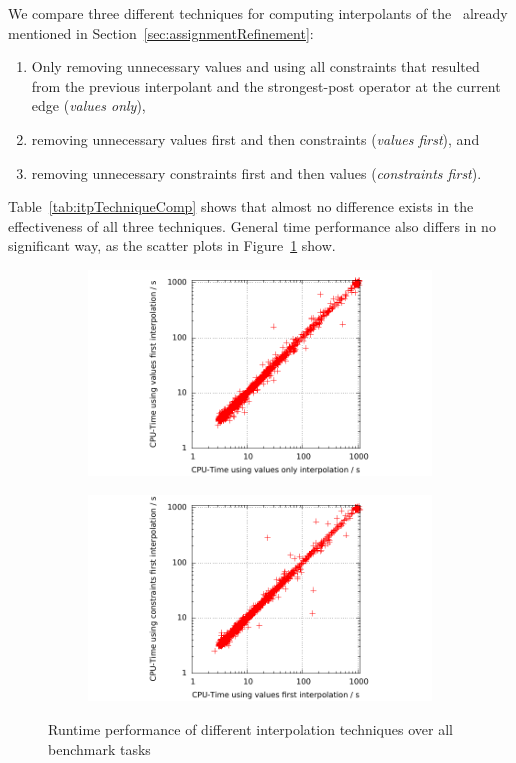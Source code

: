 We compare three different techniques for computing interpolants of the \symbolicExecutionCPA\ already mentioned in Section~\ref{sec:assignmentRefinement}:
\begin{enumerate}[label=\alph*)]
\item Only removing unnecessary values and using all constraints that resulted from the previous interpolant and the strongest-post operator at the current edge (\emph{values only}),
\item removing unnecessary values first and then constraints (\emph{values first}), and
\item removing unnecessary constraints first and then values (\emph{constraints first}).
\end{enumerate}
Table~\ref{tab:itpTechniqueComp} shows that almost no difference exists in the effectiveness of all three techniques.
General time performance also differs in no significant way, as the scatter plots in Figure~\ref{fig:spTimeVOVF} show.
\begin{figure}[t]
\begin{subfigure}[b]{.48\textwidth}
\includegraphics[trim=2cm 0 1cm 0, clip=true, scale=.9]{evaluation/sp_valuesOnly_valuesFirst_cputime}
\end{subfigure}%
\hfill
\begin{subfigure}[b]{.48\textwidth}
\includegraphics[trim=2cm 0 1cm 0, clip=true, scale=.9]{evaluation/sp_valuesFirst_constrFirst_cputime}
\end{subfigure}
\caption{Runtime performance of different interpolation techniques over all benchmark tasks}
\label{fig:spTimeVOVF}
\end{figure}
